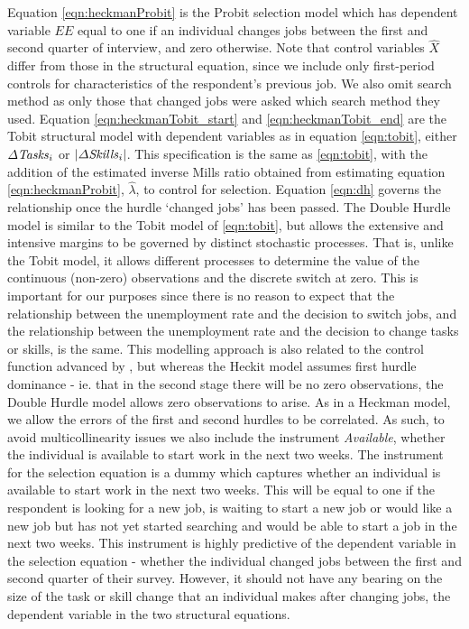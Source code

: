 \documentclass[11pt, oneside]{article}
\begin{document}
Equation \ref{eqn:heckmanProbit} is the Probit selection model which has dependent variable $EE$ equal to one if an individual changes jobs between the first and second quarter of interview, and zero otherwise. Note that control variables $\hat{X}$ differ from those in the structural equation, since we include only first-period controls for characteristics of the respondent's previous job. We also omit search method as only those that changed jobs were asked which search method they used.  Equation \ref{eqn:heckmanTobit_start} and  \ref{eqn:heckmanTobit_end} are the Tobit structural model with dependent variables as in equation \ref{eqn:tobit}, either $\Delta\text{\textit{Tasks}}_{i}$ or $|\Delta\text{\textit{Skills}}_{i}|$. This specification is the same as \ref{eqn:tobit}, with the addition of the estimated inverse Mills ratio obtained from estimating equation \ref{eqn:heckmanProbit}, $\hat{\lambda}$, to control for selection. Equation \ref{eqn:dh} governs the relationship once the hurdle `changed jobs' has been passed.  The Double Hurdle model is similar to the Tobit model of \ref{eqn:tobit}, but allows the extensive and intensive margins to be governed by distinct stochastic processes. That is, unlike the Tobit model, it allows different processes to determine the value of the continuous (non-zero) observations and the discrete switch at zero. This is important for our purposes since there is no reason to expect that the relationship between the unemployment rate and the decision to switch jobs, and the relationship between the unemployment rate and the decision to change tasks or skills, is the same. This modelling approach is also related to the control function advanced by \cite{Heckman}, but whereas the Heckit model assumes first hurdle dominance - ie. that in the second stage there will be no zero observations, the Double Hurdle model allows zero observations to arise. As in a Heckman model, we allow the errors of the first and second hurdles to be correlated. As such, to avoid multicollinearity issues we also include the instrument \textit{Available}, whether the individual is available to start work in the next two weeks. The instrument for the selection equation is a dummy which captures whether an individual is available to start work in the next two weeks. This will be equal to one if the respondent is looking for a new job, is waiting to start a new job or would like a new job but has not yet started searching and would be able to start a job in the next two weeks. This instrument is highly predictive of the dependent variable in the selection equation - whether the individual changed jobs between the first and second quarter of their survey. However, it should not have any bearing on the size of the task or skill change that an individual makes after changing jobs, the dependent variable in the two structural equations. 
	
\end{document}
